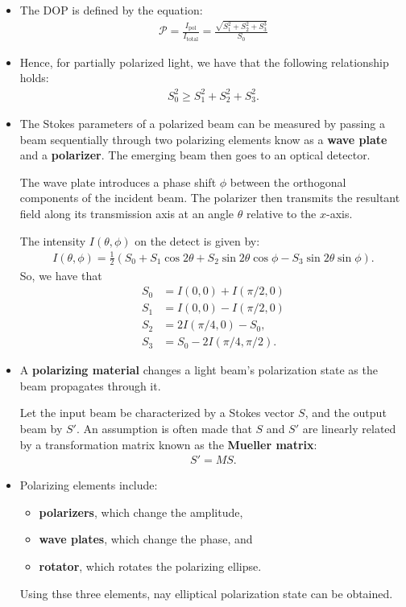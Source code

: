 \documentclass[10pt]{article}
\begin{document}
\begin{itemize}
		\item The DOP is defined by the equation:
		\begin{align*}
			\mathcal{P} 
			= \frac{I_{\mathrm{pol}}}{I_{\mathrm{total}}}
			= \frac{\sqrt{S_1^2 + S_2^2 + S_3^3}}{S_0}
		\end{align*}

		\item Hence, for partially polarized light, we have that the following relationship holds:
		\begin{align*}
			S_0^2 \geq S_1^2+ S_2^2 + S_3^2.
		\end{align*}

		\item The Stokes parameters of a polarized beam can be measured by passing a beam sequentially through two polarizing elements know as a \textbf{wave plate} and a \textbf{polarizer}.  The emerging beam then goes to an optical detector.

		The wave plate introduces a phase shift $\phi$ between the orthogonal components of the incident beam.  The polarizer then transmits the resultant field along its transmission axis at an angle $\theta$ relative to the $x$-axis.

		The intensity $I(\theta,\phi)$ on the detect is given by:
		\begin{align*}
			I(\theta,\phi) = \frac{1}{2} (S_0 + S_1 \cos 2\theta + S_2 \sin 2\theta \cos\phi - S_3 \sin 2\theta \sin \phi).
		\end{align*}
		So, we have that
		\begin{align*}
			S_0 &= I(0,0) + I(\pi/2, 0) \\
			S_1 &= I(0,0) - I(\pi/2, 0) \\
			S_2 &= 2I(\pi/4,0) - S_0, \\
			S_3 &= S_0 - 2I(\pi/4,\pi/2).
		\end{align*}

		\item A \textbf{polarizing material} changes a light beam's polarization state as the beam propagates through it.

		Let the input beam be characterized by a Stokes vector $S$, and the output beam by $S'$.  An assumption is often made that $S$ and $S'$ are linearly related by a transformation matrix known as the \textbf{Mueller matrix}:
		\begin{align*}
			S' = MS.
		\end{align*}

		\item Polarizing elements include:
		\begin{itemize}
			\item \textbf{polarizers}, which change the amplitude,
			\item \textbf{wave plates}, which change the phase, and
			\item \textbf{rotator}, which rotates the polarizing ellipse.
		\end{itemize}
		Using thse three elements, nay elliptical polarization state can be obtained.


\end{itemize}
\end{document}
